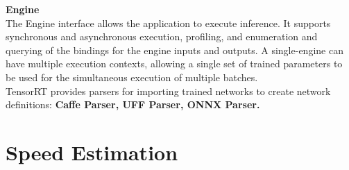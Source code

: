      \textbf{Engine} \\ 
    \vspace{3mm}
    The Engine interface allows the application to execute inference. It supports synchronous and asynchronous execution, profiling, and enumeration and querying of the bindings for the engine inputs and outputs. A single-engine can have multiple execution contexts, 
    allowing a single set of trained parameters to be used for the simultaneous execution of multiple batches. \\ 
    \vspace{3mm}
    TensorRT provides parsers for importing trained networks to create network definitions: \textbf{Caffe Parser, UFF Parser, ONNX Parser.}


\section{Speed Estimation}
